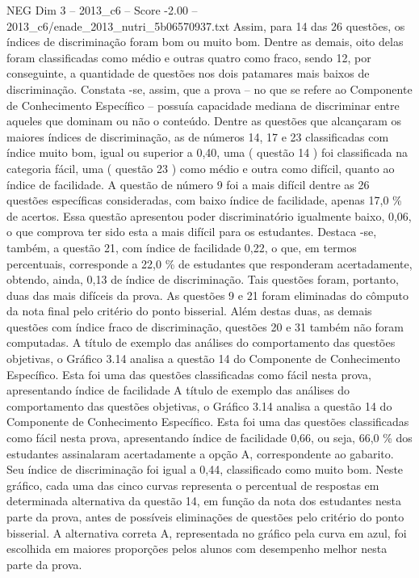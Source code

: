 \begin{textsample}{NEG Dim 3 – 2013\_c6 – Score -2.00 – 2013\_c6/enade\_2013\_nutri\_5b06570937.txt}
Assim, para 14 das 26 questões, os índices de discriminação foram bom ou muito bom.
Dentre as demais, oito delas foram classificadas como médio e outras quatro como fraco, sendo 12, por conseguinte, a quantidade de questões nos dois patamares mais baixos de discriminação.
Constata -se, assim, que a prova – no que se refere ao Componente de Conhecimento Específico – possuía capacidade mediana de discriminar entre aqueles que dominam ou não o conteúdo.
Dentre as questões que alcançaram os maiores índices de discriminação, as de números 14, 17 e 23 classificadas com índice muito bom, igual ou superior a 0,40, uma ( questão 14 ) foi classificada na categoria fácil, uma ( questão 23 ) como médio e outra como difícil, quanto ao índice de facilidade.
A questão de número 9 foi a mais difícil dentre as 26 questões específicas consideradas, com baixo índice de facilidade, apenas 17,0 \% de acertos.
Essa questão apresentou poder discriminatório igualmente baixo, 0,06, o que comprova ter sido esta a mais difícil para os estudantes.
Destaca -se, também, a questão 21, com índice de facilidade 0,22, o que, em termos percentuais, corresponde a 22,0 \% de estudantes que responderam acertadamente, obtendo, ainda, 0,13 de índice de discriminação.
Tais questões foram, portanto, duas das mais difíceis da prova.
As questões 9 e 21 foram eliminadas do cômputo da nota final pelo critério do ponto bisserial.
Além destas duas, as demais questões com índice fraco de discriminação, questões 20 e 31 também não foram computadas.
A título de exemplo das análises do comportamento das questões objetivas, o Gráfico 3.14 analisa a questão 14 do Componente de Conhecimento Específico.
Esta foi uma das questões classificadas como fácil nesta prova, apresentando índice de facilidade A título de exemplo das análises do comportamento das questões objetivas, o Gráfico 3.14 analisa a questão 14 do Componente de Conhecimento Específico.
Esta foi uma das questões classificadas como fácil nesta prova, apresentando índice de facilidade 0,66, ou seja, 66,0 \% dos estudantes assinalaram acertadamente a opção A, correspondente ao gabarito.
Seu índice de discriminação foi igual a 0,44, classificado como muito bom.
Neste gráfico, cada uma das cinco curvas representa o percentual de respostas em determinada alternativa da questão 14, em função da nota dos estudantes nesta parte da prova, antes de possíveis eliminações de questões pelo critério do ponto bisserial.
A alternativa correta A, representada no gráfico pela curva em azul, foi escolhida em maiores proporções pelos alunos com desempenho melhor nesta parte da prova.

\end{textsample}
